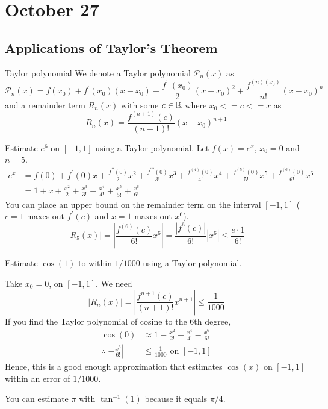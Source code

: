 \chapter{October 27}

\section{Applications of Taylor's Theorem}
\begin{definition}{Taylor polynomial}{}
    We denote a Taylor polynomial $\mathcal{P}_n(x)$ as
    $$\mathcal{P}_n(x)=f\left(x_0\right)+f^{\prime}\left(x_0\right)\left(x-x_0\right)+\frac{f^{\prime \prime}\left(x_0\right)}{2}\left(x-x_0\right)^2+\frac{f^{(n)\left(x_0\right)}}{n !}\left(x-x_0\right)^n$$ 
    and a remainder term $R_n(x)$ with some $c \in \mathbb{R}$ where $x_0 <= c <= x$ as 
    $$R_n(x)=\frac{f^{(n+1)}(c)}{(n+1) !}\left(x-x_0\right)^{n+1}$$
\end{definition}

\begin{example}
    Estimate $e^6$ on $[-1,1]$ using a Taylor polynomial.
    \noindent Let $f(x)=e^x$, $x_0=0$ and $n=5$.
    \begin{align*}
        e^x &=f(0)+f^{\prime}(0) x+\frac{f^{\prime \prime}(0)}{2} x^2+\frac{f^{\prime \prime \prime}(0)}{3 !} x^3+\frac{f^{(4)}(0)}{4 !} x^4+\frac{f^{(5)}(0)}{5 !} x^5+\frac{f^{(6)}(0)}{6 !} x^6 \\
        &=1+x+\frac{x^2}{2}+\frac{x^3}{3 !}+\frac{x^4}{4 !}+\frac{x^5}{5 !}+\frac{x^6}{6 !}
    \end{align*}
    You can place an upper bound on the remainder term on the interval $[-1,1]$ ($c=1$ maxes out $f^{\prime}(c)$ and $x=1$ maxes out $x^6$).
    $$\left|R_5(x)\right|=\left|\frac{f^{(6)}(c)}{6 !} x^6\right|=\frac{\left|f^6(c)\right|}{6 !}\left|x^6\right| \leq \frac{e \cdot 1}{6 !}$$
\end{example}

\begin{example}
    Estimate $\cos (1)$ to within $1 / 1000$ using a Taylor polynomial.

    \noindent Take $x_0=0$, on $[-1,1]$. We need $$\left|R_n(x)\right|=\left|\frac{f^{n+1}(c)}{(n+1) !} x^{n+1}\right| \leq \frac{1}{1000}$$
    If you find the Taylor polynomial of cosine to the 6th degree,
    \begin{align*}
        \cos (0) &\approx 1-\frac{x^2}{2 !}+\frac{x^4}{4 !}-\frac{x^6}{6 !} \\
        \therefore \left|-\frac{x^6}{6 !}\right| &\leq \frac{1}{1000} \text { on }[-1,1]
    \end{align*}
    Hence, this is a good enough approximation that estimates $\cos (x)$ on $[-1,1]$ within an error of $1 / 1000$.
\end{example}
\begin{note}
    You can estimate $\pi$ with $\tan^{-1}(1)$ because it equals $\pi / 4$.
\end{note}

